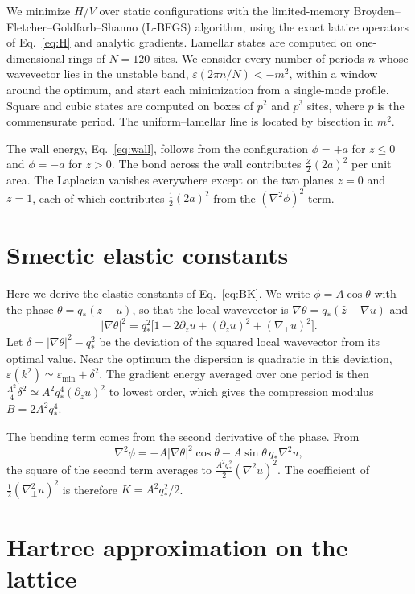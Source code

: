 \documentclass[aps,prd,twocolumn,superscriptaddress,nofootinbib,10pt]{revtex4-2}
\newcommand{\qs}{q_*}
\begin{document}
We minimize $H/V$ over static configurations with the limited-memory
Broyden--Fletcher--Goldfarb--Shanno (L-BFGS) algorithm, using the exact
lattice operators of Eq.~\eqref{eq:H} and analytic gradients.  Lamellar
states are computed on one-dimensional rings of $N=120$ sites.  We consider
every number of periods $n$ whose wavevector lies in the unstable band,
$\varepsilon(2\pi n/N)<-m^2$, within a window around the optimum, and start
each minimization from a single-mode profile.  Square and cubic states are
computed on boxes of $p^2$ and $p^3$ sites, where $p$ is the commensurate
period.  The uniform--lamellar line is located by bisection in $m^2$.

The wall energy, Eq.~\eqref{eq:wall}, follows from the configuration
$\phi=+a$ for $z\le0$ and $\phi=-a$ for $z>0$.  The bond across the wall
contributes $\frac Z2(2a)^2$ per unit area.  The Laplacian vanishes
everywhere except on the two planes $z=0$ and $z=1$, each of which
contributes $\frac12(2a)^2$ from the $(\nabla^2\phi)^2$ term.

\section{Smectic elastic constants}
\label{app:smectic}

Here we derive the elastic constants of Eq.~\eqref{eq:BK}.  We write
$\phi=A\cos\theta$ with the phase $\theta=\qs(z-u)$, so that the local
wavevector is $\nabla\theta=\qs(\hat z-\nabla u)$ and
\[
|\nabla\theta|^2=\qs^2\bigl[1-2\partial_zu+(\partial_zu)^2+(\nabla_\perp u)^2\bigr].
\]
Let $\delta=|\nabla\theta|^2-\qs^2$ be the deviation of the squared local
wavevector from its optimal value.  Near the optimum the dispersion is
quadratic in this deviation, $\varepsilon(k^2)\simeq\varepsilon_{\min}+\delta^2$.
The gradient energy averaged over one period is then
$\frac{A^2}{4}\delta^2\simeq A^2\qs^4(\partial_zu)^2$ to lowest order, which
gives the compression modulus $B=2A^2\qs^4$.

The bending term comes from the second derivative of the phase.  From
\[
\nabla^2\phi=-A|\nabla\theta|^2\cos\theta-A\sin\theta\,\qs\nabla^2u,
\]
the square of the second term averages to $\frac{A^2\qs^2}{2}(\nabla^2u)^2$.
The coefficient of $\frac12(\nabla_\perp^2u)^2$ is therefore $K=A^2\qs^2/2$.

\section{Hartree approximation on the lattice}
\label{app:hartree}
\end{document}

